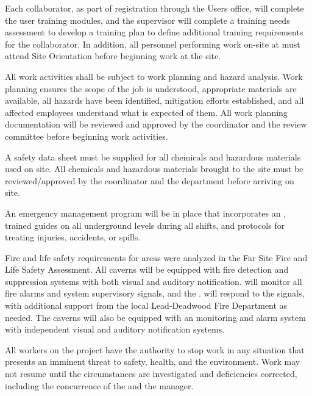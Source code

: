 Each  collaborator, as part of registration through the \fnal Users office,
will complete the user  training modules, and the supervisor
will complete a training needs assessment to develop a training plan
to define additional   training requirements for the collaborator.
In addition, all personnel performing work on-site at  must
attend   Site Orientation before beginning work at the site.


All work activities
shall be subject to work planning and hazard analysis. 
Work planning ensures the scope of
the job is understood, appropriate materials are available, all
hazards have been identified, mitigation efforts established, and all
affected employees understand what is expected of them.   
All work planning documentation will be reviewed and
approved by the   coordinator and the 
 review committee before beginning work activities.

A safety data sheet must be supplied for all chemicals and
hazardous materials used on site. All chemicals and hazardous
materials brought to the  site must be reviewed/approved by the
  coordinator and the  
department before arriving on site.

An emergency management program will be in place that incorporates an ,  trained guides on all underground levels during all shifts, and protocols for treating injuries, accidents, or spills.

Fire and life safety requirements for  areas
were analyzed in the  Far Site Fire and Life
Safety Assessment. All caverns will be equipped with fire detection
and suppression systems with both visual and auditory notification.  
 will monitor all fire alarms and system supervisory signals, and the  . 
will respond to the signals, with additional support from the local Lead-Deadwood Fire
Department as needed.  The caverns will also be equipped
with an  monitoring and alarm system with independent visual and
auditory notification systems.


All workers on the  project have the
authority to stop work in any situation that presents an imminent
threat to safety, health, and the environment. Work may not resume
until the circumstances are investigated and deficiencies corrected,
including the concurrence of the  
and the   manager.


